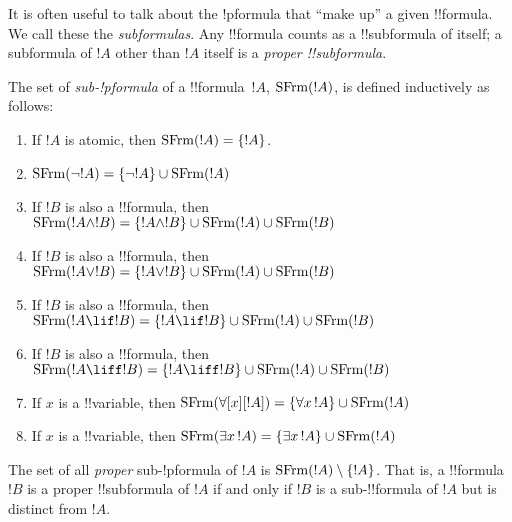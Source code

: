 \documentclass[../../include/open-logic-section]{subfiles}
\begin{document}


\begin{explain}
It is often useful to talk about the !p{formula} that ``make up'' a given
!!{formula}.  We call these the \emph{subformulas}.  Any !!{formula} counts as
a !!{subformula} of itself; a subformula of $!A$ other than $!A$ itself is
a \emph{proper !!{subformula}}.
\end{explain}

\begin{defn}
The set of \emph{sub-!p{formula}} of a !!{formula}~$!A$,
$\mathrm{SFrm}({!A})$, is defined inductively as follows:
\begin{enumerate}
\item If $!A$ is atomic, then $\mathrm{SFrm}({!A}) = \{!A\}$.
\item $\mathrm{SFrm}({\lnot !A}) = \{\lnot !A\} \cup \mathrm{SFrm}({!A})$
\item If $!B$ is also a !!{formula}, then $\mathrm{SFrm}({!A \land !B}) = \{!A
  \land !B\} \cup \mathrm{SFrm}({!A}) \cup \mathrm{SFrm}({!B})$
\item If $!B$ is also a !!{formula}, then $\mathrm{SFrm}({!A \lor !B}) = \{!A \lor
  !B\} \cup \mathrm{SFrm}({!A}) \cup \mathrm{SFrm}({!B})$
\item If $!B$ is also a !!{formula}, then $\SubFrm{!A \lif !B} = \{!A \lif
  !B\} \cup \SubFrm{!A} \cup \SubFrm{!B}$
\item If $!B$ is also a !!{formula}, then $\SubFrm{!A \liff !B} = \{!A
  \liff !B\} \cup \SubFrm{!A} \cup \SubFrm{!B}$
\item If $x$ is a !!{variable}, then $\SubFrm{\forall[x][!A]} =
  \{\lforall[x][!A]\} \cup \SubFrm{!A}$
\item If $x$ is a !!{variable}, then $\SubFrm{\lexists[x][!A]} =
  \{\lexists[x][!A]\} \cup \SubFrm{!A}$
\end{enumerate}
The set of all \emph{proper} sub-!p{formula} of $!A$ is $\mathrm{SFrm}({!A}) \setminus
\{!A\}$. That is, a !!{formula} $!B$ is a proper !!{subformula} of $!A$ if and
only if $!B$ is a sub-!!{formula} of $!A$ but is distinct from $!A$.
\end{defn}

\end{document}
